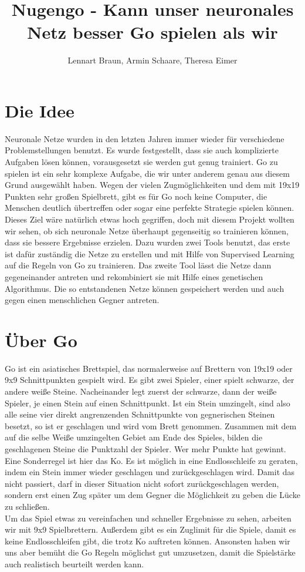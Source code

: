 \documentclass[12pt,a4paper]{article}
\author{Lennart Braun, Armin Schaare, Theresa Eimer}
\title{Nugengo - Kann unser neuronales Netz besser Go spielen als wir}
\begin{document}
\maketitle
\tableofcontents

\section{Die Idee}

Neuronale Netze wurden in den letzten Jahren immer wieder für verschiedene Problemstellungen benutzt. Es wurde festgestellt, dass sie auch komplizierte Aufgaben lösen können, vorausgesetzt sie werden gut genug trainiert. Go zu spielen ist ein sehr komplexe Aufgabe, die wir unter anderem genau aus diesem Grund ausgewählt haben. Wegen der vielen Zugmöglichkeiten und dem mit 19x19 Punkten sehr großen Spielbrett, gibt es für Go noch keine Computer, die Menschen deutlich übertreffen oder sogar eine perfekte Strategie spielen können. Dieses Ziel wäre natürlich etwas hoch gegriffen, doch mit diesem Projekt wollten wir sehen, ob sich neuronale Netze überhaupt gegenseitig so trainieren können, dass sie bessere Ergebnisse erzielen. Dazu wurden zwei Tools benutzt, das erste ist dafür zuständig die Netze zu erstellen und mit Hilfe von Supervised Learning auf die Regeln von Go zu trainieren. Das zweite Tool lässt die Netze dann gegeneinander antreten und rekombiniert sie mit Hilfe eines genetischen Algorithmus. Die so entstandenen Netze können gespeichert werden und auch gegen einen menschlichen Gegner antreten.

\section{Über Go}
Go ist ein asiatisches Brettspiel, das normalerweise auf Brettern von 19x19 oder 9x9 Schnittpunkten gespielt wird. Es gibt zwei Spieler, einer spielt schwarze, der andere weiße Steine. Nacheinander legt zuerst der schwarze, dann der weiße Spieler, je einen Stein auf einen Schnittpunkt. Ist ein Stein umzingelt, sind also alle seine vier direkt angrenzenden Schnittpunkte von gegnerischen Steinen besetzt, so ist er geschlagen und wird vom Brett genommen. Zusammen mit dem auf die selbe Weiße umzingelten Gebiet am Ende des Spieles, bilden die geschlagenen Steine die Punktzahl der Spieler. Wer mehr Punkte hat gewinnt. Eine Sonderregel ist hier das Ko. Es ist möglich in eine Endlosschleife zu geraten, indem ein Stein immer wieder geschlagen und zurückgeschlagen wird. Damit das nicht passiert, darf in dieser Situation nicht sofort zurückgeschlagen werden, sondern erst einen Zug später um dem Gegner die Möglichkeit zu geben die Lücke zu schließen. 
\\
Um das Spiel etwas zu vereinfachen und schneller Ergebnisse zu sehen, arbeiten wir mit 9x9 Spielbrettern. Außerdem gibt es ein Zuglimit für die Spiele, damit es keine Endlosschleifen gibt, die trotz Ko auftreten können. Ansonsten haben wir uns aber bemüht die Go Regeln möglichst gut umzusetzen, damit die Spielstärke auch realistisch beurteilt werden kann.
\end{document}
